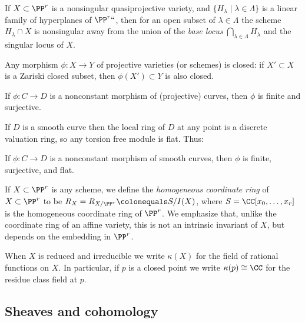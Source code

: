 \begin{theorem}\label{Bertini}
If $X\subset \PP^r$  is a nonsingular quasiprojective variety, and $\{H_\lambda \mid \lambda\in \Lambda\}$ is a linear family of hyperplanes of $\PP^r` `$, then for an open subset of $\lambda\in \Lambda$ the scheme $H_\lambda \cap X$ is nonsingular away from the union of the \emph{base locus}
$
\bigcap_{\lambda \in \Lambda} H_\lambda
$
and the singular locus of $X$.
%
%
\end{theorem}

\begin{theorem}
 Any morphism $\phi: X\to Y$ of projective varieties (or schemes) is closed: if $X'\subset X$ is a Zariski closed subset,
 then $\phi(X') \subset Y$ is also closed.
%
%
\end{theorem}

\begin{corollary}
If $\phi: C\to D$ is a nonconstant morphism of (projective) curves, then $\phi$ is finite and surjective. 
\end{corollary}

If $D$ is a 
smooth curve then the local ring of $D$ at any point is a discrete valuation ring, so any torsion free module is flat. 
Thus:

\begin{proposition}
If $\phi: C\to D$ is a nonconstant morphism of smooth curves, then $\phi$ is finite, surjective, and flat.
\end{proposition}

If $X\subset \PP^{r}$ is any scheme, we define the 
\emph{homogeneous coordinate ring}
%
of $X\subset \PP^{r}$
to be $R_{X} = R_{X/\PP^{r}}\colonequals S/I(X)$, where $S =\CC[x_{0}, \dots, x_{r}]$ is the homogeneous coordinate ring of $\PP^{r}$. We emphasize
that, unlike the coordinate ring of an affine variety, this is not an intrinsic invariant of $X$, but depends on the 
embedding in $\PP^{r}$. 

When $X$ is reduced and irreducible we write $\kappa(X)$ for the field of rational functions on $X$. In particular, if
$p$ is a closed point  we write $\kappa(p)\cong \CC$ for the residue class field at $p$.

\subsection*{Sheaves and cohomology} 

